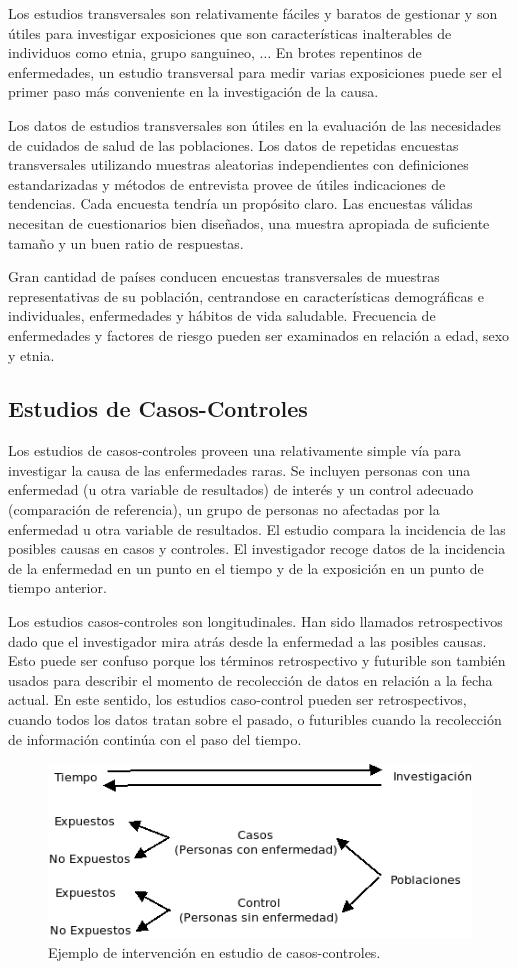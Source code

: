 Los estudios transversales son relativamente fáciles y baratos de gestionar y son útiles para investigar exposiciones que son características inalterables de individuos como etnia, grupo sanguineo, $\dots$ En brotes repentinos de enfermedades, un estudio transversal para medir varias exposiciones puede ser el primer paso más conveniente en la investigación de la causa.

Los datos de estudios transversales son útiles en la evaluación de las necesidades de cuidados de salud de las poblaciones. Los datos de repetidas encuestas transversales utilizando muestras aleatorias independientes con definiciones estandarizadas y métodos de entrevista provee de útiles indicaciones de tendencias. Cada encuesta tendría un propósito claro. Las encuestas válidas necesitan de cuestionarios bien diseñados, una muestra apropiada de suficiente tamaño y un buen ratio de respuestas.

Gran cantidad de países conducen encuestas transversales de muestras representativas de su población, centrandose en características demográficas e individuales, enfermedades y hábitos de vida saludable. Frecuencia de enfermedades y factores de riesgo pueden ser examinados en relación a edad, sexo y etnia.
\subsection{Estudios de Casos-Controles}
Los estudios de casos-controles proveen una relativamente simple vía para investigar la causa de las enfermedades raras. Se incluyen personas con una enfermedad (u otra variable de resultados) de interés y un control adecuado (comparación de referencia), un grupo de personas no afectadas por la enfermedad u otra variable de resultados. El estudio compara la incidencia de las posibles causas en casos y controles. El investigador recoge datos de la incidencia de la enfermedad en un punto en el tiempo y de la exposición en un punto de tiempo anterior.

Los estudios casos-controles son longitudinales. Han sido llamados retrospectivos dado que el investigador mira atrás desde la enfermedad a las posibles causas. Esto puede ser confuso porque los términos retrospectivo y futurible son también usados para describir el momento de recolección de datos en relación a la fecha actual. En este sentido, los estudios caso-control pueden ser retrospectivos, cuando todos los datos tratan sobre el pasado, o futuribles cuando la recolección de información continúa con el paso del tiempo.
\begin{figure}[H]
	\centering
	\includegraphics[width=0.5\columnwidth]{A.imagenes/ACV-EPI-CasosControles}
	\caption{Ejemplo de intervención en estudio de casos-controles.}
\end{figure}
